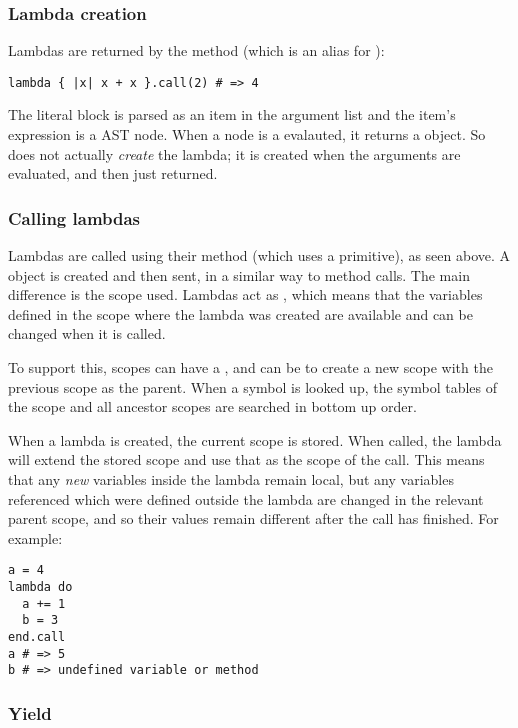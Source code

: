 \subsubsection{Lambda creation}

Lambdas are returned by the  method (which is an alias for ):

\begin{lstlisting}
lambda { |x| x + x }.call(2) # => 4
\end{lstlisting}

The literal block is parsed as an item in the argument list and the item's expression is a  AST node. When a  node is a evalauted, it returns a  object. So  does not actually \textit{create} the lambda; it is created when the arguments are evaluated, and then just returned.

\subsubsection{Calling lambdas}

Lambdas are called using their  method (which uses a primitive), as seen above. A  object is created and then sent, in a similar way to method calls. The main difference is the scope used. Lambdas act as , which means that the variables defined in the scope where the lambda was created are available and can be changed when it is called.

To support this, scopes can have a , and can be  to create a new scope with the previous scope as the parent. When a symbol is looked up, the symbol tables of the scope and all ancestor scopes are searched in bottom up order.

When a lambda is created, the current scope is stored. When called, the lambda will extend the stored scope and use that as the scope of the call. This means that any \textit{new} variables inside the lambda remain local, but any variables referenced which were defined outside the lambda are changed in the relevant parent scope, and so their values remain different after the call has finished. For example:

\begin{lstlisting}
a = 4
lambda do
  a += 1
  b = 3
end.call
a # => 5
b # => undefined variable or method
\end{lstlisting}

\subsubsection{Yield}

